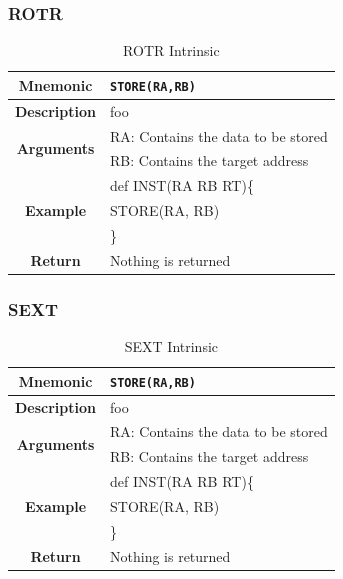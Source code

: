 \documentclass{article}
\begin{document}
\clearpage
\subsubsection{ROTR}
\label{sec:ROTR}

\begin{table}[h]
\begin{center}
\caption{ROTR Intrinsic}
\vspace{0.125in}
\label{tab:ROTRIntrinsic}
\begin{tabular}{|c|l|}
\hline
\textbf{Mnemonic} & \texttt{STORE(RA,RB)}\\
\hline
\textbf{Description} & foo\\
\hline
\multirow{2}{*}{\textbf{Arguments}} & RA: Contains the data to be stored\\
                          			     & RB: Contains the target address \\
\hline
\multirow{3}{*}{\textbf{Example}} & def INST(RA RB RT)\{\\
                          			  &   STORE(RA, RB)\\
                                                    & \}\\
\hline
\textbf{Return} & Nothing is returned\\                                                    
\hline
\end{tabular}
\end{center}
\end{table}

\clearpage
\subsubsection{SEXT}
\label{sec:SEXT}

\begin{table}[h]
\begin{center}
\caption{SEXT Intrinsic}
\vspace{0.125in}
\label{tab:SEXTIntrinsic}
\begin{tabular}{|c|l|}
\hline
\textbf{Mnemonic} & \texttt{STORE(RA,RB)}\\
\hline
\textbf{Description} & foo\\
\hline
\multirow{2}{*}{\textbf{Arguments}} & RA: Contains the data to be stored\\
                          			     & RB: Contains the target address \\
\hline
\multirow{3}{*}{\textbf{Example}} & def INST(RA RB RT)\{\\
                          			  &   STORE(RA, RB)\\
                                                    & \}\\
\hline
\textbf{Return} & Nothing is returned\\                                                    
\hline
\end{tabular}
\end{center}
\end{table}
\end{document}
